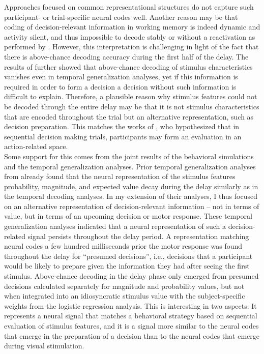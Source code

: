 Approaches focused on common representational structures do not capture such participant- or trial-specific neural codes well.
Another reason may be that coding of decision-relevant information in working memory is indeed dynamic and activity silent, and thus impossible to decode stably or without a reactivation as performed by \citet{wolff2017dynamic}.
However, this interpretation is challenging in light of the fact that there is above-chance decoding accuracy during the first half of the delay.
The results of \citet{kaiserposter} further showed that above-chance decoding of stimulus characteristics vanishes even in temporal generalization analyses, yet if this information is required in order to form a decision a decision without such information is difficult to explain.
Therefore, a plausible reason why stimulus features could not be decoded through the entire delay may be that it is not stimulus characteristics that are encoded throughout the trial but an alternative representation, such as decision preparation.
This matches the works of \citet{hunt2013trial}, who hypothesized that in sequential decision making trials, participants may form an evaluation in an action-related space. \\
Some support for this comes from the joint results of the behavioral simulations and the temporal generalization analyses.
Prior temporal generalization analyses from \citet{kaiserposter} already found that the neural representation of the stimulus features probability, magnitude, and expected value decay during the delay similarly as in the temporal decoding analyses.
In my extension of their analyses, I thus focused on an alternative representation of decision-relevant information -- not in terms of value, but in terms of an upcoming decision or motor response.
These temporal generalization analyses indicated that a neural representation of such a decision-related signal persists throughout the delay period.
A representation matching neural codes a few hundred milliseconds prior the motor response was found throughout the delay for ``presumed decisions'', i.e., decisions that a participant would be likely to prepare given the information they had after seeing the first stimulus.
Above-chance decoding in the delay phase only emerged from presumed decisions calculated separately for magnitude and probability values, but not when integrated into an idiosyncratic stimulus value with the subject-specific weights from the logistic regression analysis.
This is interesting in two aspects: It represents a neural signal that matches a behavioral strategy based on sequential evaluation of stimulus features, and it is a signal more similar to the neural codes that emerge in the preparation of a decision than to the neural codes that emerge during visual stimulation.
